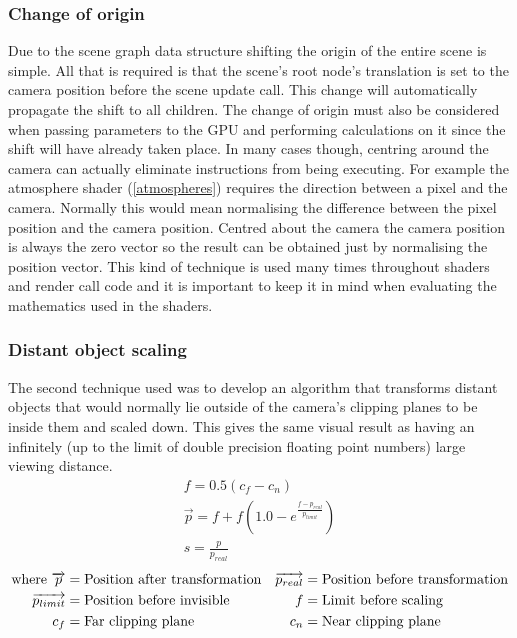 \subsubsection{Change of origin}

Due to the scene graph data structure shifting the origin of the entire scene is simple. All that is required is that the scene's root node's translation is set to the camera position before the scene update call. This change will automatically propagate the shift to all children. The change of origin must also be considered when passing parameters to the GPU and performing calculations on it since the shift will have already taken place. In many cases though, centring around the camera can actually eliminate instructions from being executing. For example the atmosphere shader (\cref{atmospheres}) requires the direction between a pixel and the camera. Normally this would mean normalising the difference between the pixel position and the camera position. Centred about the camera the camera position is always the zero vector so the result can be obtained just by normalising the position vector. This kind of technique is used many times throughout shaders and render call code and it is important to keep it in mind when evaluating the mathematics used in the shaders.

\subsubsection{Distant object scaling}

The second technique used was to develop an algorithm that transforms distant objects that would normally lie outside of the camera's clipping planes to be inside them and scaled down. This gives the same visual result as having an infinitely (up to the limit of double precision floating point numbers) large viewing distance.
\begin{align}
f = 0.5(c_f-c_n) \\
\overrightarrow{p}=f+f(1.0-e^{\frac{f-p_{real}}{p_{limit}}})\\
s=\frac{p}{p_{real}}
\end{align}
\vspace{-15pt} 
\begin{align*}
\text{where}~
\overrightarrow{p} &= \text{Position after transformation}  &
\overrightarrow{p_{real}} &= \text{Position before transformation}  \notag\\
\overrightarrow{p_{limit}} &= \text{Position before invisible}  &
f &= \text{Limit before scaling}  \notag\\
c_f &= \text{Far clipping plane} & c_n &= \text{Near clipping plane}  \notag\\
\end{align*}
\vspace{-25pt} 

